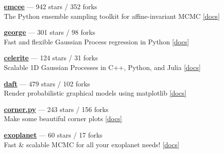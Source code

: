 \item \href{https://github.com/dfm/emcee}{{\bf emcee}} --- 942 stars / 352 forks \\
The Python ensemble sampling toolkit for affine-invariant MCMC \href{http://emcee.readthedocs.io}{[docs]}

\item \href{https://github.com/dfm/george}{{\bf george}} --- 301 stars / 98 forks \\
Fast and flexible Gaussian Process regression in Python \href{http://george.readthedocs.io}{[docs]}

\item \href{https://github.com/dfm/celerite}{{\bf celerite}} --- 124 stars / 31 forks \\
Scalable 1D Gaussian Processes in C++, Python, and Julia \href{http://celerite.rtfd.io}{[docs]}

\item \href{https://github.com/daft-dev/daft}{{\bf daft}} --- 479 stars / 102 forks \\
Render probabilistic graphical models using matplotlib \href{http://daft-pgm.org}{[docs]}

\item \href{https://github.com/dfm/corner.py}{{\bf corner.py}} --- 243 stars / 156 forks \\
Make some beautiful corner plots \href{http://corner.readthedocs.io}{[docs]}

\item \href{https://github.com/dfm/exoplanet}{{\bf exoplanet}} --- 60 stars / 17 forks \\
Fast {\&} scalable MCMC for all your exoplanet needs!  \href{https://exoplanet.dfm.io}{[docs]}